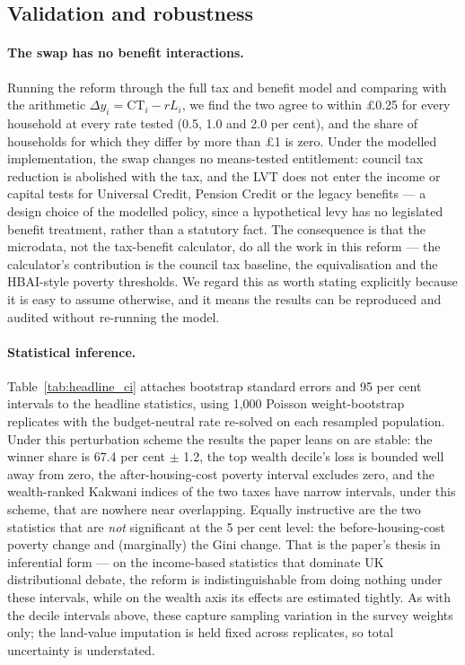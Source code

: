 \subsection{Validation and robustness}
\label{sec:robustness}

\paragraph{The swap has no benefit interactions.} Running the reform through the full tax and benefit model and comparing with the arithmetic $\Delta y_i = \mathrm{CT}_i - r L_i$, we find the two agree to within \pounds 0.25 for every household at every rate tested (0.5, 1.0 and 2.0 per cent), and the share of households for which they differ by more than \pounds 1 is zero. Under the modelled implementation, the swap changes no means-tested entitlement: council tax reduction is abolished with the tax, and the LVT does not enter the income or capital tests for Universal Credit, Pension Credit or the legacy benefits --- a design choice of the modelled policy, since a hypothetical levy has no legislated benefit treatment, rather than a statutory fact. The consequence is that the microdata, not the tax-benefit calculator, do all the work in this reform --- the calculator's contribution is the council tax baseline, the equivalisation and the HBAI-style poverty thresholds. We regard this as worth stating explicitly because it is easy to assume otherwise, and it means the results can be reproduced and audited without re-running the model.

\paragraph{Statistical inference.} Table~\ref{tab:headline_ci} attaches bootstrap standard errors and 95 per cent intervals to the headline statistics, using 1{,}000 Poisson weight-bootstrap replicates with the budget-neutral rate re-solved on each resampled population. Under this perturbation scheme the results the paper leans on are stable: the winner share is 67.4 per cent $\pm$ 1.2, the top wealth decile's loss is bounded well away from zero, the after-housing-cost poverty interval excludes zero, and the wealth-ranked Kakwani indices of the two taxes have narrow intervals, under this scheme, that are nowhere near overlapping. Equally instructive are the two statistics that are \emph{not} significant at the 5 per cent level: the before-housing-cost poverty change and (marginally) the Gini change. That is the paper's thesis in inferential form --- on the income-based statistics that dominate UK distributional debate, the reform is indistinguishable from doing nothing under these intervals, while on the wealth axis its effects are estimated tightly. As with the decile intervals above, these capture sampling variation in the survey weights only; the land-value imputation is held fixed across replicates, so total uncertainty is understated.

